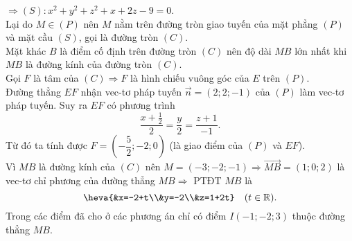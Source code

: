 \begin{ex}
{$\Rightarrow (S)\colon x^2 + y^2 + z^2 + x + 2z - 9 = 0$.\\
Lại do $M \in (P)$ nên $M$ nằm trên đường tròn giao tuyến của mặt phẳng $(P)$ và mặt cầu $(S)$, gọi là đường tròn $(C)$.\\
 Mặt khác $B$ là điểm cố định trên đường tròn $(C)$ nên độ dài $MB$ lớn nhất khi $MB$ là đường kính của đường tròn $(C)$.\\
 Gọi $F$ là tâm của $(C) \Rightarrow F$ là hình chiếu vuông góc của $E$ trên $(P)$.\\
Đường thẳng $EF$ nhận vec-tơ pháp tuyến $\overrightarrow{n} = (2; 2; -1)$ của $(P)$ làm vec-tơ pháp tuyến. Suy ra $EF$ có phương trình
$$ \dfrac{x + \frac{1}{2}}{2} = \dfrac{y}{2} = \dfrac{z + 1}{-1}.$$
Từ đó ta tính được $F = \left( -\dfrac{5}{2}; -2; 0 \right)$ (là giao điểm của $(P)$ và $EF$).\\
 Vì $MB$ là đường kính của $(C)$ nên $M = (-3; -2; -1) \Rightarrow \overrightarrow{MB} = (1; 0; 2)$ là vec-tơ chỉ phương của đường thẳng $MB \Rightarrow$ PTĐT $MB$ là 
$$\heva{&x=-2+t\\&y=-2\\&z=1+2t} \quad (t \in \mathbb{R}).$$
 Trong các điểm đã cho ở các phương án chỉ có điểm $I (-1; -2; 3)$  thuộc đường thẳng $MB$.	
}
\end{ex}
